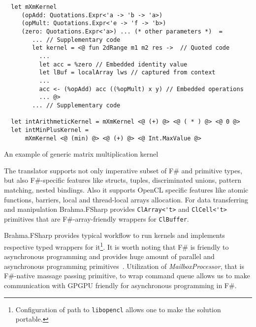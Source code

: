 \begin{listing}
    \begin{verbatim}
  let mXmKernel    
     (opAdd: Quotations.Expr<'a -> 'b -> 'a>) 
     (opMult: Quotations.Expr<'e -> 'f -> 'b>) 
     (zero: Quotations.Expr<'a>) ... (* other parameters *)  =
        ... // Supplementary code
        let kernel = <@ fun 2dRange m1 m2 res ->  // Quoted code
          ... 
          let acc = %zero // Embedded identity value
          let lBuf = localArray lws // captured from context
          ... 
          acc <- (%opAdd) acc ((%opMult) x y) // Embedded operations
          ... @>
        ... // Supplementary code
    
  let intArithmeticKernel = mXmKernel <@ (+) @> <@ ( * ) @> <@ 0 @>
  let intMinPlusKernel = 
      mXmKernel <@ (min) @> <@ (+) @> <@ Int.MaxValue @>
    \end{verbatim}
    \caption{An example of generic matrix multiplication kernel}
    \label{lst:mXm_kernels}
  \end{listing}

The translator supports not only imperative subset of F\# and primitive types, but also F\#-specific features like structs, tuples, discriminated unions, pattern matching, nested bindings.
Also it supports OpenCL specific features like atomic functions, barriers, local and thread-local arrays allocation.
For data transferring and manipulation Brahma.FSharp provides \verb|ClArray<'t>| and \verb|ClCell<'t>| primitives that are F\#-array-friendly wrappers for \texttt{ClBuffer}.

Brahma.FSharp provides typical workflow to run kernels and implements respective typed wrappers for it\footnote{Configuration of path to \texttt{libopencl} allows one to make the solution portable.}.
It is worth noting that F\# is friendly to asynchronous programming and provides huge amount of parallel and asynchronous programming primitives~\cite{FSharpAsync}.
Utilization of \emph{MailboxProcessor}, that is F\#-native massage passing primitive, to wrap command queue allows us to make communication with GPGPU friendly for asynchronous programming in F\#.